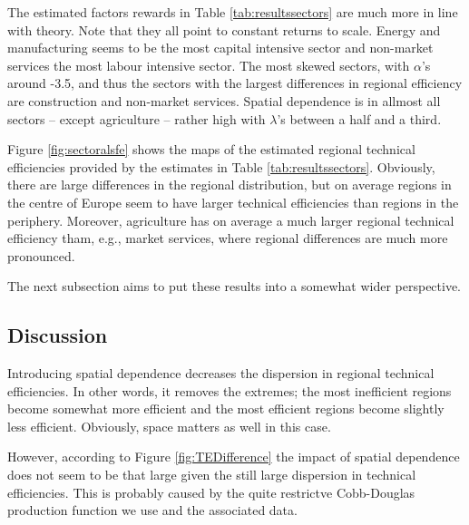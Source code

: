 \documentclass[11pt,parskip,abstracton,notitlepage]{scrartcl}
\begin{document}
The estimated factors rewards in Table \ref{tab:resultssectors} are much more in line with theory. Note that they all point to constant returns to scale. Energy and manufacturing seems to be the most capital intensive sector and non-market services the most labour intensive sector. The most skewed sectors, with $\alpha$'s around -3.5, and thus the sectors with the largest differences in regional efficiency are construction and non-market services. Spatial dependence is in allmost all sectors -- except agriculture -- rather high with $\lambda$'s between a half and a third.

Figure \ref{fig:sectoralsfe} shows the maps of the estimated regional technical efficiencies provided by the estimates in Table \ref{tab:resultssectors}. Obviously, there are large differences in the regional distribution, but on average regions in the centre of Europe seem to have larger technical efficiencies than regions in the periphery. Moreover, agriculture has on average a much larger regional technical efficiency tham, e.g., market services, where regional differences are much more pronounced. 

The next subsection aims to put these results into a somewhat wider perspective. 
%
\subsection{Discussion}
%
Introducing spatial dependence decreases the dispersion in regional technical efficiencies. In other words, it removes the extremes; the most inefficient regions become somewhat more efficient and the most efficient regions become slightly less efficient. Obviously, space matters as well in this case. 

However, according to Figure \ref{fig:TEDifference} the impact of spatial dependence does not seem to be that large given the still large dispersion in technical efficiencies. This is probably caused by the quite restrictve Cobb-Douglas production function we use and the associated data.
\end{document}
